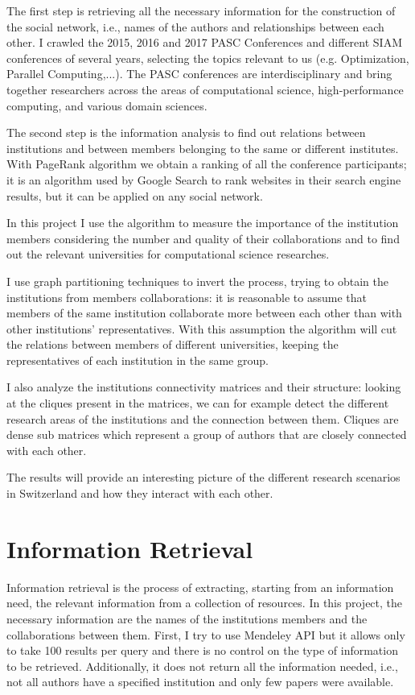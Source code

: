 \documentclass[]{usiinfbachelorproject}
\begin{document}
The first step is retrieving all the necessary information for the construction of the social network, i.e., names of the authors and relationships between each other. I crawled the 2015, 2016 and 2017 PASC Conferences and different SIAM conferences of several years, selecting the topics relevant to us (e.g. Optimization, Parallel Computing,...). The PASC conferences are interdisciplinary and bring together researchers across the areas of computational science, high-performance computing, and various domain sciences.

The second step is the information analysis to find out relations between institutions and between members belonging to the same or different institutes. With PageRank algorithm we obtain a ranking of all the conference participants; it is an algorithm used by Google Search to rank websites in their search engine results, but it can be applied on any social network. 

In this project I use the algorithm to measure the importance of the institution members considering the number and quality of their collaborations and to find out the relevant universities for computational science researches. 

I use graph partitioning techniques to invert the process, trying to obtain the institutions from members collaborations: it is reasonable to assume that members of the same institution collaborate more between each other than with other institutions' representatives. With this assumption the algorithm will cut the relations between members of different universities, keeping the representatives of each institution in the same group.

I also analyze the institutions connectivity matrices and their structure: looking at the cliques present in the matrices, we can for example detect the different research areas of the institutions and the connection between them. Cliques are dense sub matrices which represent a group of authors that are closely connected with each other. 

The results will provide an interesting picture of the different research scenarios in Switzerland and how they interact with each other.






\section{Information Retrieval} \label{sec:inforetrieval} 
Information retrieval is the process of extracting, starting from an information need, the relevant information from a collection of resources. In this project, the necessary information are the names of the institutions members and the collaborations between them. 
First, I try to use Mendeley API but it allows only to take 100 results per query and there is no control on the type of information to be retrieved. Additionally, it does not return all the information needed, i.e., not all authors have a specified institution and only few papers were available.
\end{document}
